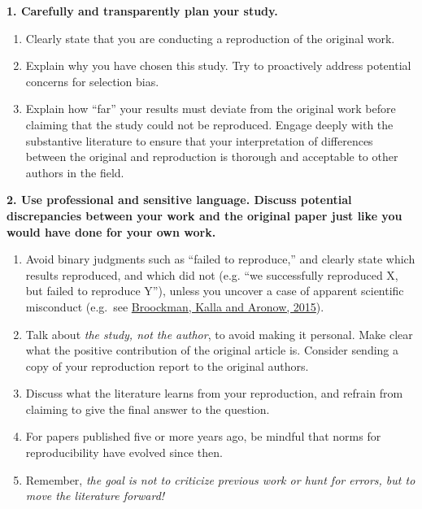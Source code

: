 \documentclass[]{book}
\providecommand{\tightlist}{%
  \setlength{\itemsep}{0pt}\setlength{\parskip}{0pt}}
\begin{document}
\textbf{1. Carefully and transparently plan your study. }

\begin{enumerate}
\def\labelenumi{\alph{enumi}.}
\tightlist
\item
  Clearly state that you are conducting a reproduction of the original work.\\
\item
  Explain why you have chosen this study. Try to proactively address potential concerns for selection bias.\\
\item
  Explain how ``far'' your results must deviate from the original work before claiming that the study could not be reproduced. Engage deeply with the substantive literature to ensure that your interpretation of differences between the original and reproduction is thorough and acceptable to other authors in the field.
\end{enumerate}

\textbf{2. Use professional and sensitive language. Discuss potential discrepancies between your work and the original paper just like you would have done for your own work.}

\begin{enumerate}
\def\labelenumi{\alph{enumi}.}
\tightlist
\item
  Avoid binary judgments such as ``failed to reproduce,'' and clearly state which results reproduced, and which did not (e.g. ``we successfully reproduced X, but failed to reproduce Y''), unless you uncover a case of apparent scientific misconduct (e.g.~see \href{https://osf.io/qy2se/}{Broockman, Kalla and Aronow, 2015}).\\
\item
  Talk about \emph{the study, not the author}, to avoid making it personal. Make clear what the positive contribution of the original article is. Consider sending a copy of your reproduction report to the original authors.\\
\item
  Discuss what the literature learns from your reproduction, and refrain from claiming to give the final answer to the question.\\
\item
  For papers published five or more years ago, be mindful that norms for reproducibility have evolved since then.\\
\item
  Remember, \emph{the goal is not to criticize previous work or hunt for errors, but to move the literature forward!}
\end{enumerate}
\end{document}
